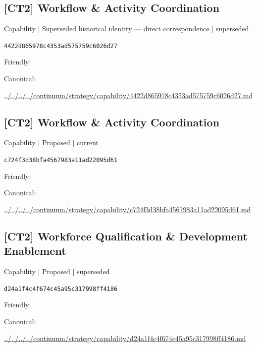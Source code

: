 \documentclass[10pt,a4paper]{article}
\begin{document}
\subsection*{[CT2] Workflow \& Activity Coordination}
{\small Capability | Superseded historical identity — direct correspondence | superseded}\par
\texttt{4422d865978c4353ad575759c6026d27}\par
Friendly: \par
Canonical: \par
{\footnotesize\url{../../../../continuum/strategy/capability/4422d865978c4353ad575759c6026d27.md}}\par
\subsection*{[CT2] Workflow \& Activity Coordination}
{\small Capability | Proposed | current}\par
\texttt{c724f3d38bfa4567983a11ad22095d61}\par
Friendly: \par
Canonical: \par
{\footnotesize\url{../../../../continuum/strategy/capability/c724f3d38bfa4567983a11ad22095d61.md}}\par
\subsection*{[CT2] Workforce Qualification \& Development Enablement}
{\small Capability | Proposed | superseded}\par
\texttt{d24a1f4c4f674c45a95c317998ff4186}\par
Friendly: \par
Canonical: \par
{\footnotesize\url{../../../../continuum/strategy/capability/d24a1f4c4f674c45a95c317998ff4186.md}}\par
\end{document}
